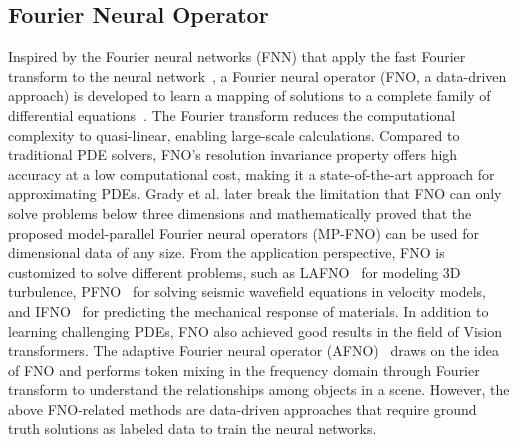 \subsection{Fourier Neural Operator}
Inspired by the Fourier neural networks (FNN) that apply the fast Fourier transform to the neural network~\cite{silvescu1999fourier}, a Fourier neural operator (FNO, a data-driven approach) is developed to learn a mapping of solutions to a complete family of differential equations~\cite{li2020fourier}. 
The Fourier transform reduces the computational complexity to quasi-linear, enabling large-scale calculations. 
Compared to traditional PDE solvers, FNO's resolution invariance property offers high accuracy at a low computational cost, making it a state-of-the-art approach for approximating PDEs.
Grady et al.\cite{grady2022towards} later break the limitation that FNO can only solve problems below three dimensions and mathematically proved that the proposed model-parallel Fourier neural operators (MP-FNO) can be used for dimensional data of any size. 
From the application perspective, FNO is customized to solve different problems, such as LAFNO~\cite{peng2022linear} for modeling 3D turbulence, PFNO~\cite{li2022solving} for solving seismic wavefield equations in velocity models, and IFNO~\cite{you2022learning} for predicting the mechanical response of materials.
In addition to learning challenging PDEs, FNO also achieved good results in the field of Vision transformers. The adaptive Fourier neural operator (AFNO)~\cite{guibas2021adaptive} draws on the idea of FNO and performs token mixing in the frequency domain through Fourier transform to understand the relationships among objects in a scene.
However, the above FNO-related methods are data-driven approaches that require ground truth solutions as labeled data to train the neural networks. 

